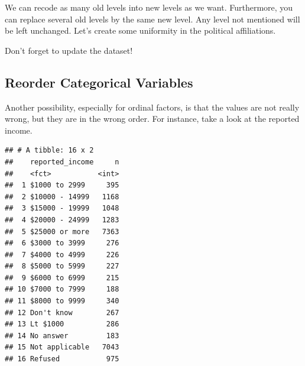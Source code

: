 \documentclass[]{tufte-book}
\newenvironment{Shaded}{}{}
\newcommand{\DataTypeTok}[1]{\textcolor[rgb]{0.56,0.13,0.00}{#1}}
\newcommand{\KeywordTok}[1]{\textcolor[rgb]{0.00,0.44,0.13}{\textbf{#1}}}
\newcommand{\NormalTok}[1]{#1}
\newcommand{\OperatorTok}[1]{\textcolor[rgb]{0.40,0.40,0.40}{#1}}
\newcommand{\StringTok}[1]{\textcolor[rgb]{0.25,0.44,0.63}{#1}}
\begin{document}
We can recode as many old levels into new levels as we want. Furthermore, you can replace several old levels by the same new level. Any level not mentioned will be left unchanged. Let's create some uniformity in the political affiliations.

\begin{Shaded}
\end{Shaded}

Don't forget to update the dataset!

\hypertarget{reorder-categorical-variables}{%
\subsection{Reorder Categorical Variables}\label{reorder-categorical-variables}}

Another possibility, especially for ordinal factors, is that the values are not really wrong, but they are in the wrong order. For instance, take a look at the reported income.

\begin{Shaded}
\end{Shaded}

\begin{verbatim}
## # A tibble: 16 x 2
##    reported_income     n
##    <fct>           <int>
##  1 $1000 to 2999     395
##  2 $10000 - 14999   1168
##  3 $15000 - 19999   1048
##  4 $20000 - 24999   1283
##  5 $25000 or more   7363
##  6 $3000 to 3999     276
##  7 $4000 to 4999     226
##  8 $5000 to 5999     227
##  9 $6000 to 6999     215
## 10 $7000 to 7999     188
## 11 $8000 to 9999     340
## 12 Don't know        267
## 13 Lt $1000          286
## 14 No answer         183
## 15 Not applicable   7043
## 16 Refused           975
\end{verbatim}
\end{document}
